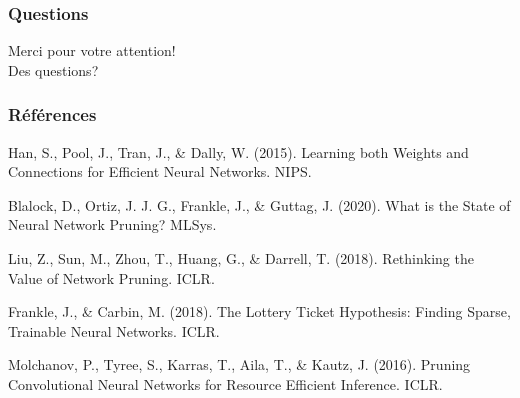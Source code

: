 \documentclass[10pt]{beamer}
\begin{document}
\begin{frame}
\frametitle{Questions}
\begin{center}
\Huge Merci pour votre attention!\\
\vspace{1cm}
\Large Des questions?
\end{center}
\end{frame}

\begin{frame}
\frametitle{Références}
\footnotesize
\begin{thebibliography}{9}
 Han, S., Pool, J., Tran, J., \& Dally, W. (2015). Learning both Weights and Connections for Efficient Neural Networks. NIPS.

 Blalock, D., Ortiz, J. J. G., Frankle, J., \& Guttag, J. (2020). What is the State of Neural Network Pruning? MLSys.

 Liu, Z., Sun, M., Zhou, T., Huang, G., \& Darrell, T. (2018). Rethinking the Value of Network Pruning. ICLR.

 Frankle, J., \& Carbin, M. (2018). The Lottery Ticket Hypothesis: Finding Sparse, Trainable Neural Networks. ICLR.

 Molchanov, P., Tyree, S., Karras, T., Aila, T., \& Kautz, J. (2016). Pruning Convolutional Neural Networks for Resource Efficient Inference. ICLR.
\end{thebibliography}
\end{frame}
\end{document}
